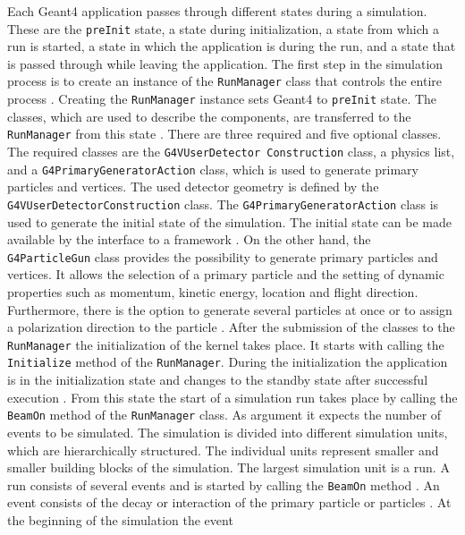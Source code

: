 \documentclass[12pt, a4paper]{thesis}
\begin{document}
Each Geant4 application passes through different states during a
simulation. These are the \texttt{preInit} state, a state during
initialization, a state from which a run is started, a state in which
the application is during the run, and a state that is passed through
while leaving the application. The first step in the simulation
process is to create an instance of the \texttt{RunManager} class that
controls the entire process \cite{geant4-doc} . Creating the
\texttt{RunManager} instance sets Geant4 to \texttt{preInit}
state. The classes, which are used to describe the components, are
transferred to the \texttt{RunManager} from this state
\cite{geant4-doc} . There are three required and five optional
classes. The required classes are the \texttt{G4VUserDetector
  Construction} class, a physics list, and a
\texttt{G4PrimaryGeneratorAction} class, which is used to generate
primary particles and vertices. The used detector geometry is defined
by the \texttt{G4VUserDetectorConstruction} class. The
\texttt{G4PrimaryGeneratorAction} class is used to generate the
initial state of the simulation. The initial state can be made
available by the interface to a framework \cite{geant_simul_toolkit}
. On the other hand, the \texttt{G4ParticleGun} class provides the
possibility to generate primary particles and vertices. It allows the
selection of a primary particle and the setting of dynamic properties
such as momentum, kinetic energy, location and flight
direction. Furthermore, there is the option to generate several
particles at once or to assign a polarization direction to the
particle \cite{geant4-doc}. After the submission of the classes to the
\texttt{RunManager} the initialization of the kernel takes place. It
starts with calling the \texttt{Initialize} method of the
\texttt{RunManager}. During the initialization the application is in
the initialization state and changes to the standby state after
successful execution \cite{geant4-doc}. From this state the start of a
simulation run takes place by calling the \texttt{BeamOn} method of
the \texttt{RunManager} class. As argument it expects the number of
events to be simulated.  The simulation is divided into different
simulation units, which are hierarchically structured. The individual
units represent smaller and smaller building blocks of the simulation.
The largest simulation unit is a run. A run consists of several events
and is started by calling the \texttt{BeamOn} method
\cite{geant4-doc,geant4-rec-dev}. An event consists of the decay or
interaction of the primary particle or particles
\cite{geant4-rec-dev}. At the beginning of the simulation the event
\end{document}
